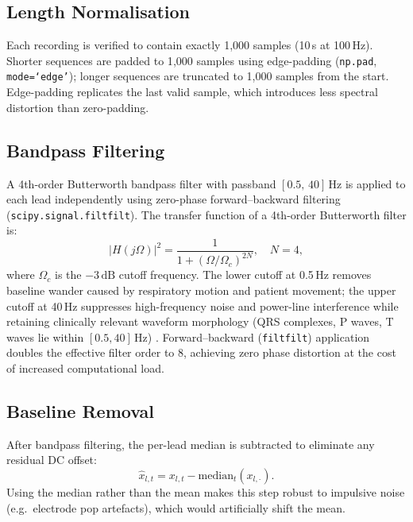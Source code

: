 \subsection{Length Normalisation}

Each recording is verified to contain exactly 1{,}000 samples
(10\,s at 100\,Hz).
Shorter sequences are padded to 1{,}000 samples using edge-padding
(\texttt{np.pad}, \texttt{mode=`edge'});
longer sequences are truncated to 1{,}000 samples from the start.
Edge-padding replicates the last valid sample, which introduces
less spectral distortion than zero-padding.

\subsection{Bandpass Filtering}

A 4th-order Butterworth bandpass filter with passband
$[0.5,\, 40]\,\text{Hz}$ is applied to each lead independently using
zero-phase forward--backward filtering (\texttt{scipy.signal.filtfilt}).
The transfer function of a 4th-order Butterworth filter is:
\begin{equation}
  |H(j\Omega)|^2 = \frac{1}{1 + \left(\Omega / \Omega_c\right)^{2N}},
  \quad N = 4,
  \label{eq:butterworth}
\end{equation}
where $\Omega_c$ is the $-3\,\text{dB}$ cutoff frequency.
The lower cutoff at 0.5\,Hz removes baseline wander caused by
respiratory motion and patient movement;
the upper cutoff at 40\,Hz suppresses high-frequency noise and
power-line interference while retaining clinically relevant waveform
morphology (QRS complexes, P waves, T waves lie within $[0.5, 40]\,\text{Hz}$)
\cite{ref37,ref23}.
Forward--backward (\texttt{filtfilt}) application doubles the effective
filter order to 8, achieving zero phase distortion at the cost of
increased computational load.

\subsection{Baseline Removal}

After bandpass filtering, the per-lead median is subtracted to eliminate
any residual DC offset:
\begin{equation}
  \hat{x}_{l,t} = x_{l,t} - \mathrm{median}_t(x_{l,\cdot}).
  \label{eq:baseline}
\end{equation}
Using the median rather than the mean makes this step robust to
impulsive noise (e.g.\ electrode pop artefacts), which would
artificially shift the mean.

